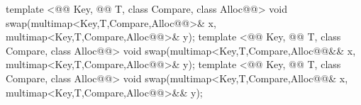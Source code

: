 \documentclass[american,twoside]{book}
\begin{document}
\begin{codeblock}
{  template <@@ Key, @@ T, class Compare, class Alloc@@>
    void swap(multimap<Key,T,Compare,Alloc@@>& x,
              multimap<Key,T,Compare,Alloc@@>& y);
  template <@@ Key, @@ T, class Compare, class Alloc@@>
    void swap(multimap<Key,T,Compare,Alloc@@&& x,
              multimap<Key,T,Compare,Alloc@@>& y);
  template <@@ Key, @@ T, class Compare, class Alloc@@>
    void swap(multimap<Key,T,Compare,Alloc@@& x,
              multimap<Key,T,Compare,Alloc@@>&& y);
}
\end{codeblock}

%
\end{document}

